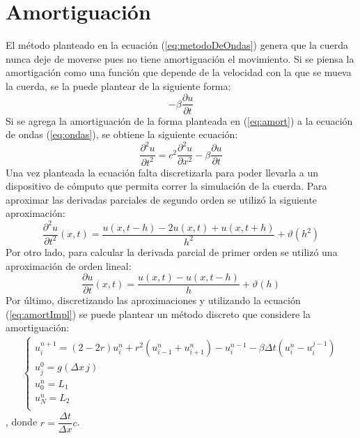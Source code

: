 \documentclass[11pt,a4paper]{emulateapj}
\begin{document}
\section{Amortiguación}
El método planteado en la ecuación (\ref{eq:metodoDeOndas}) genera que la cuerda nunca deje de moverse pues no tiene amortiguación el movimiento. Si se piensa la amortigación como una función que depende de la velocidad con la que se mueva la cuerda, se la puede plantear de la siguiente forma:
\begin{equation}
\label{eq:amort}
-\beta \frac{\partial u}{\partial t}
\end{equation}
Si se agrega la amortiguación de la forma planteada en (\ref{eq:amort}) a la ecuación de ondas (\ref{eq:ondas}), se obtiene la siguiente ecuación:
\begin{equation}
\label{eq:amortImpl}
\frac{\partial ^2 u}{\partial t^2} = c^2 \frac{\partial ^2 u}{\partial x^2} - \beta \frac{\partial u}{\partial t} 
\end{equation}
Una vez planteada la ecuación falta discretizarla para poder llevarla a un dispositivo de cómputo que permita correr la simulación de la cuerda. Para aproximar las derivadas parciales de segundo orden se utilizó la siguiente aproximación:
\begin{equation}
\frac{\partial ^2 u}{\partial t^2}(x,t) = \frac{u(x,t-h) -2 u(x,t) + u(x,t+h)}{h^2} +\vartheta(h^2)
\end{equation}
Por otro lado, para calcular la derivada parcial de primer orden se utilizó una aproximación de orden lineal:
\begin{equation}
\frac{\partial u}{\partial t}(x,t) = \frac{u(x,t) - u(x,t-h)}{h} +\vartheta(h)
\end{equation}
Por último, discretizando las aproximaciones y utilizando la ecuación (\ref{eq:amortImpl}) se puede plantear un método discreto que considere la amortiguación:
\begin{eqnarray}
	\label{eq:metodoDeOndas}
	\left\{
		\begin{matrix}
			u_i^{n+1} = (2-2r) u_i^n + r^2 (u_{i-1}^n+u_{i+1}^n) - u_i^{n-1} - \beta\Delta t(u_i^n - u_i^{j-1})\\
			u_j^0 = g(\Delta x\, j)\\
			u_0^n = L_1\\ 
			u_N^n = L_2\\
		\end{matrix} \right.
\end{eqnarray}	
, donde $r = \dfrac{\Delta t}{\Delta x}c$.
\end{document}

